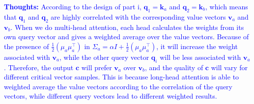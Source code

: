 \documentclass[letterpaper,12pt]{article}
\begin{document}
\begin{itemize}
		\textcolor{blue}{\textbf{Thoughts:} According to the design of part i, $\mathbf{q}_1 = \mathbf{k}_a$ and $\mathbf{q}_2 = \mathbf{k}_b$, which means that $\mathbf{q}_1$ and $\mathbf{q}_2$ are highly correlated with the corresponding value vectors $\mathbf{v}_a$ and $\mathbf{v}_b$.
		When we do multi-head attention, each head calculates the weights from its own query vector and gives a weighted average over the value vectors.
		Because of the presence of $\frac{1}{2} (\mu_a \mu_a^\top) $ in  $\Sigma_a = \alpha I + \frac{1}{2}(\mu_a \mu_a^\top) $, it will increase the weight associated with $\mathbf{v}_a$, while the other query vector $\mathbf{q}_i$ will be less associated with $\mathbf{v}_a$. Therefore, the output $\mathbf{c}$ will prefer $\mathbf{v}_a$ over $\mathbf{v}_b$, and the quality of $\mathbf{c}$ will vary for different critical vector samples. This is because long-head attention is able to weighted average the value vectors according to the correlation of the query vectors, while different query vectors lead to different weighted results.
		}
		

\end{itemize}
\end{document}
